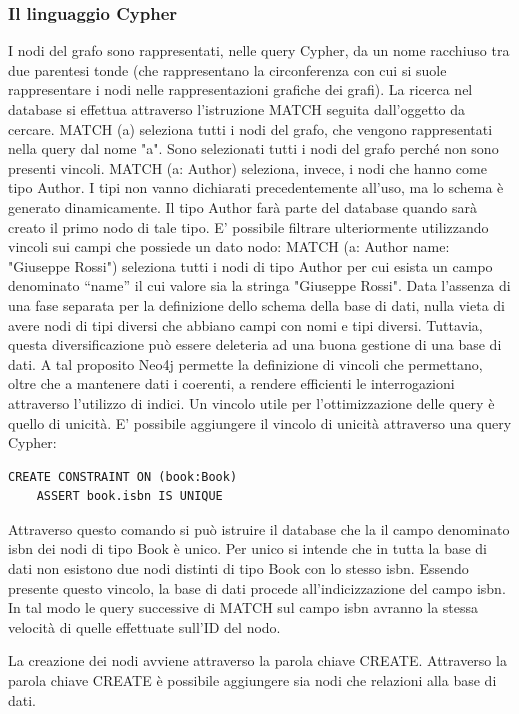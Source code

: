 \documentclass[a4paper, 12pt]{article}
\begin{document}
\subsubsection{Il linguaggio Cypher}
I nodi del grafo sono rappresentati, nelle query Cypher, da un nome racchiuso tra due parentesi tonde (che rappresentano la circonferenza con cui si suole rappresentare i nodi nelle rappresentazioni grafiche dei grafi). La ricerca nel database si effettua attraverso l'istruzione MATCH seguita dall'oggetto da cercare.
MATCH (a) seleziona tutti i nodi del grafo, che vengono rappresentati nella query dal nome "a". Sono selezionati tutti i nodi del grafo perché non sono presenti vincoli.
MATCH (a: Author) seleziona, invece, i nodi che hanno come tipo Author. I tipi non vanno dichiarati precedentemente all'uso, ma lo schema è generato dinamicamente. Il tipo Author farà parte del database quando sarà creato il primo nodo di tale tipo.
E' possibile filtrare ulteriormente utilizzando vincoli sui campi che possiede un dato nodo:
MATCH (a: Author {name: "Giuseppe Rossi"}) seleziona tutti i nodi di tipo Author per cui esista un campo denominato ``name'' il cui valore sia la stringa "Giuseppe Rossi". Data l'assenza di una fase separata per la definizione dello schema della base di dati, nulla vieta di avere nodi di tipi diversi che abbiano campi con nomi e tipi diversi. Tuttavia, questa diversificazione può essere deleteria ad una buona gestione di una base di dati. A tal proposito Neo4j permette la definizione di vincoli che permettano, oltre che a mantenere dati i coerenti, a rendere efficienti le interrogazioni attraverso l'utilizzo di indici.
Un vincolo utile per l'ottimizzazione delle query è quello di unicità. E' possibile aggiungere il vincolo di unicità attraverso una query Cypher:
\begin{lstlisting}[keepspaces=true]
  CREATE CONSTRAINT ON (book:Book)
    ASSERT book.isbn IS UNIQUE
\end{lstlisting}
Attraverso questo comando si può istruire il database che la il campo denominato isbn dei nodi di tipo Book è unico. Per unico si intende che in tutta la base di dati non esistono due nodi distinti di tipo Book con lo stesso isbn. Essendo presente questo vincolo, la base di dati procede all'indicizzazione del campo isbn. In tal modo le query successive di MATCH sul campo isbn avranno la stessa velocità di quelle effettuate sull'ID del nodo.
\par
La creazione dei nodi avviene attraverso la parola chiave CREATE. Attraverso la parola chiave CREATE è possibile aggiungere sia nodi che relazioni alla base di dati. \\
\end{document}
